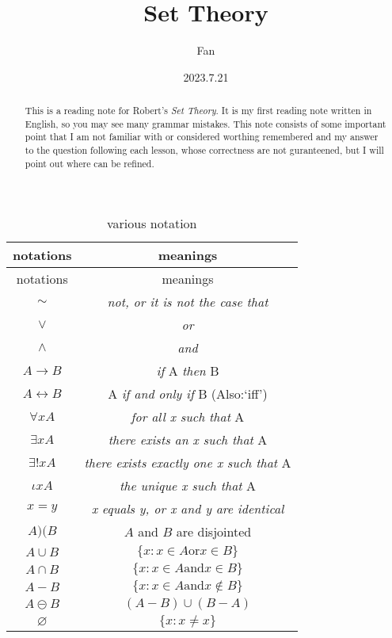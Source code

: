 \documentclass[a4paper,11pt]{article}%
\author{Fan}
\title{Set Theory}
\date{2023.7.21}
\theoremstyle{remark}
\theoremstyle{definition}
\theoremstyle{definition}
\theoremstyle{plain}
\theoremstyle{definition}
\begin{document}
\maketitle
\tableofcontents
\begin{abstract}
    This is a reading note for Robert's \emph{Set Theory}. It is my first 
    reading note written in English, so you may see many grammar mistakes. 
    This note consists of some important point that I am not familiar with 
    or considered worthing remembered and my answer to the question following
    each lesson, whose correctness are not guranteened, but I will point out
    where can be refined.
\end{abstract}
\pagestyle{plain}%
\begin{longtable}{cc}
        \caption{various notation} \\
       \multicolumn{1}{c}{notations}&\multicolumn{1}{c}{meanings}\\
       \hline
       \endfirsthead
       \multicolumn{1}{c}{notations}&\multicolumn{1}{c}{meanings}\\
       \hline\endhead
 $\sim$& \emph{not, or it is not the case that}\\
$\lor$&  \emph{or}\\
$\land $&  \emph{and}\\
$A\rightarrow B$&  \emph{if} A \emph{then } B\\
$A\leftrightarrow B$ &  A \emph{if and only if } B (Also:`iff')\\
$\forall xA$ &  \emph{for all x such that } A\\
$\exists xA$ &  \emph{there exists an x such that } A\\
$\exists!xA$ &  \emph{there exists exactly one x such that }A\\
$\iota xA$& \emph{the unique x such that }A\\
$x=y$&  \emph{x equals y, or x and y are identical}\\
$A)(B$& $A$ and $B$ are disjointed\\
   $ A \cup B$ & $  \{x:x\in A \text{or} x \in B\}$\\
   $ A \cap B $& $ \{x:x\in A \text{and} x \in B\}$\\
    $A - B $&  $ \{x:x\in A \text{and} x \notin B\}$\\
   $ A \circleddash  B$ &$   (A-B)\cup(B-A)$\\
    $\varnothing $&$   \{x:x \neq x\}$\\

\end{longtable}
\end{document}
